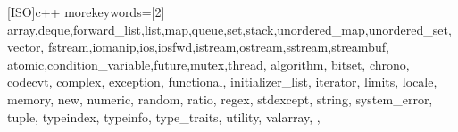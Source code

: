 [ISO]{c++}
{
    morekeywords=[2]{
        array,deque,forward_list,list,map,queue,set,stack,unordered_map,unordered_set,vector,
        fstream,iomanip,ios,iosfwd,istream,ostream,sstream,streambuf,
        atomic,condition_variable,future,mutex,thread,
        algorithm,
        bitset,
        chrono,
        codecvt,
        complex,
        exception,
        functional,
        initializer_list,
        iterator,
        limits,
        locale,
        memory,
        new,
        numeric,
        random,
        ratio,
        regex,
        stdexcept,
        string,
        system_error,
        tuple,
        typeindex,
        typeinfo,
        type_traits,
        utility,
        valarray,
    },
}

